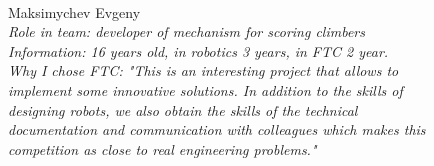 \begin{figure}[H]
	\begin{minipage}[h]{0.47\linewidth}
		\\
	\end{minipage}
	\hfill
	\begin{minipage}[h]{0.47\linewidth}
		Maksimychev Evgeny\\
		\emph{Role in team: developer of mechanism for scoring climbers \\}
		\emph{Information: 16 years old, in robotics 3 years, in FTC 2 year. \\}
		\emph{Why I chose FTC: "This is an interesting project that allows to implement some innovative solutions. In addition to the skills of designing robots, we also obtain the skills of the technical documentation and communication with colleagues which makes this competition as close to real engineering problems."}	
	\end{minipage}
\end{figure}
\vfill 
